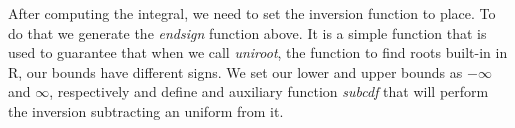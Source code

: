 \documentclass[12pt,oneside]{reedthesis}
\theoremstyle{definition}
\theoremstyle{definition}
\theoremstyle{remark}
\begin{document}
  \footnotesize
  \begin{Shaded}
  \begin{Highlighting}[]
  \StringTok{ }
      
  \StringTok{ }
        \NormalTok{(}\OperatorTok{*}\StringTok{ }\NormalTok{(}\OperatorTok{-}\OperatorTok{*}\StringTok{ }\OperatorTok{*}\StringTok{ }\OperatorTok{/}
  \NormalTok{    \}}
  \NormalTok{  \}}
    
  \StringTok{ }
  \StringTok{ } \OperatorTok{-}\StringTok{ }\OperatorTok{/}\OperatorTok{*}\StringTok{ }\OperatorTok{::}\NormalTok{(} \NormalTok{, } \NormalTok{,}
                                   \NormalTok{, } \NormalTok{)}\OperatorTok{$}
  \NormalTok{  \}}
    
    
  \StringTok{ } \NormalTok{) \{}
  \StringTok{ }
      \OperatorTok{*}\StringTok{ }\OperatorTok{<}\StringTok{ }\StringTok{ } \OperatorTok{*}\StringTok{ }
  \NormalTok{  \}}
  \end{Highlighting}
  \end{Shaded}
  \normalsize
  
  After computing the integral, we need to set the inversion function to
  place. To do that we generate the \emph{endsign} function above. It is a
  simple function that is used to guarantee that when we call
  \emph{uniroot}, the function to find roots built-in in R, our bounds
  have different signs. We set our lower and upper bounds as \(- \infty\)
  and \(\infty\), respectively and define and auxiliary function
  \emph{subcdf} that will perform the inversion subtracting an uniform
  from it.
  
\end{document}
